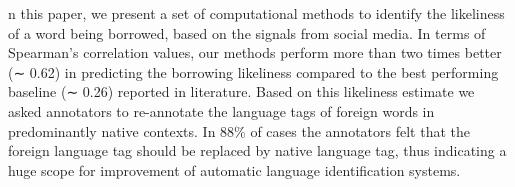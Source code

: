 n this paper, we present a set of computational methods to identify the likeliness of a word being borrowed, based on the signals from social media. In terms of Spearman's correlation values, our methods perform more than two times better (∼ 0.62) in predicting the borrowing likeliness compared to the best performing baseline (∼ 0.26) reported in literature. Based on this likeliness estimate we asked annotators to re-annotate the language tags of foreign words in predominantly native contexts. In 88\% of cases the annotators felt that the foreign language tag should be replaced by native language tag, thus indicating a huge scope for improvement of automatic language identification systems.

